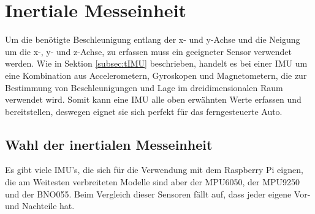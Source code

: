\section{Inertiale Messeinheit}
\label{sec:IMU}
Um die benötigte Beschleunigung entlang der x- und y-Achse und die Neigung um die x-, y- und z-Achse, zu erfassen muss ein geeigneter Sensor verwendet werden. Wie in Sektion \ref{subsec:tIMU} beschrieben, handelt es bei einer IMU um eine Kombination aus Accelerometern, Gyroskopen und Magnetometern, die zur Bestimmung von Beschleunigungen und Lage im dreidimensionalen Raum verwendet wird. Somit kann eine IMU alle oben erwähnten Werte erfassen und bereitstellen, deswegen eignet sie sich perfekt für das ferngesteuerte Auto.
\subsection{Wahl der inertialen Messeinheit}
\label{subsec:IMUchoice}
Es gibt viele \ac{IMU}'s, die sich für die Verwendung mit dem Raspberry Pi eignen, die am Weitesten verbreiteten Modelle sind aber der MPU6050, der MPU9250 und der BNO055. Beim Vergleich dieser Sensoren fällt auf, dass jeder eigene Vor- und Nachteile hat. 
